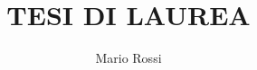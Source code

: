 \documentclass[12pt,twoside,a4paper,fleqn,openright]{book}
\author{Mario Rossi}
\title{TESI DI LAUREA}
\begin{document}

\maketitle

\pagestyle{empty}

\tableofcontents


\pagestyle{fancyplain}
\addtolength{\headwidth}{\marginparsep}
\addtolength{\headwidth}{\marginparwidth}
\renewcommand{\chaptermark}[1]{\markboth{{\chaptername\ \thechapter}\ \--- #1}{}} %
\renewcommand{\sectionmark}[1]{\markright{\thesection\ \ #1}}
\lhead[\fancyplain{}{\thepage}]{\fancyplain{}{\emph\rightmark}}
\rhead[\fancyplain{}{\emph\leftmark}]{\fancyplain{}{\thepage}}
\cfoot{}

  
    
    
    
         
         

\begin{comment} 


\listoffigures

\listoftables

\end{comment}
\end{document}
